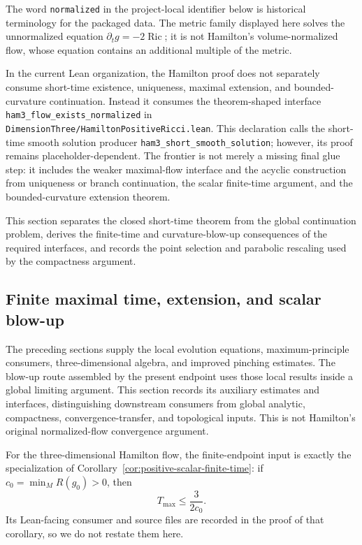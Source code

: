 \documentclass[11pt]{article}
\theoremstyle{plain}
\theoremstyle{definition}
\theoremstyle{remark}
\newcommand{\Ric}{\operatorname{Ric}}
\newcommand{\leanref}[1]{\nolinkurl{#1}}
\newcommand{\leanfile}[1]{\nolinkurl{#1}}
\newcommand{\rffile}[1]{\leanfile{#1}}
\begin{document}
The word \texttt{normalized} in the project-local identifier below is
historical terminology for the packaged data.  The metric family displayed
here solves the unnormalized equation \(\partial_tg=-2\Ric\); it is not
Hamilton's volume-normalized flow, whose equation contains an additional
multiple of the metric.

In the current Lean organization, the
Hamilton proof does not separately consume short-time existence, uniqueness,
maximal extension, and bounded-curvature continuation.  Instead it consumes the
theorem-shaped interface \leanref{ham3_flow_exists_normalized} in
\rffile{DimensionThree/HamiltonPositiveRicci.lean}.  This declaration calls the
short-time smooth solution producer
\leanref{ham3_short_smooth_solution}; however,
its proof remains
placeholder-dependent.  The frontier is not merely a missing final glue step:
it includes the weaker maximal-flow interface and the acyclic construction
from uniqueness or branch continuation, the scalar finite-time argument, and
the bounded-curvature extension theorem.



This section separates the closed short-time theorem from the global
continuation problem, derives the finite-time and curvature-blow-up
consequences of the required interfaces, and records the point selection and
parabolic rescaling used by the compactness argument.

\subsection{Finite maximal time, extension, and scalar blow-up}

The preceding sections supply the local evolution equations, maximum-principle
consumers, three-dimensional algebra, and improved pinching estimates.  The
blow-up route assembled by the present endpoint uses those local results inside
a global limiting argument.  This section records its auxiliary estimates and
interfaces, distinguishing downstream consumers from global analytic,
compactness, convergence-transfer, and topological inputs.  This is not
Hamilton's original normalized-flow convergence argument.

For the three-dimensional Hamilton flow, the finite-endpoint input is exactly
the specialization of Corollary~\ref{cor:positive-scalar-finite-time}: if
\(c_0=\min_M R(g_0)>0\), then
\[
  T_{\max}\le \frac{3}{2c_0}.
\]
Its Lean-facing consumer and source files are recorded in the proof of that
corollary, so we do not restate them here.
\end{document}
